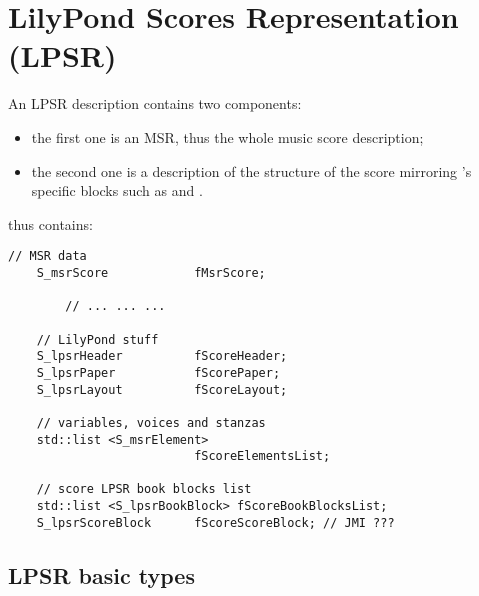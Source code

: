 



\chapter{LilyPond Scores Representation (LPSR)}


An LPSR description contains two components:
\begin{itemize}
\item the first one is an MSR, thus the whole music score description;
\item the second one is a description of the structure of the score mirroring \lily's specific blocks such as  and .
\end{itemize}

 thus contains:
\begin{lstlisting}[language=CPlusPlus]
    // MSR data
    S_msrScore            fMsrScore;

		// ... ... ...

    // LilyPond stuff
    S_lpsrHeader          fScoreHeader;
    S_lpsrPaper           fScorePaper;
    S_lpsrLayout          fScoreLayout;

    // variables, voices and stanzas
    std::list <S_msrElement>
                          fScoreElementsList;

    // score LPSR book blocks list
    std::list <S_lpsrBookBlock> fScoreBookBlocksList;
    S_lpsrScoreBlock      fScoreScoreBlock; // JMI ???
\end{lstlisting}

\section{LPSR basic types}\label{LPSR basic types}

